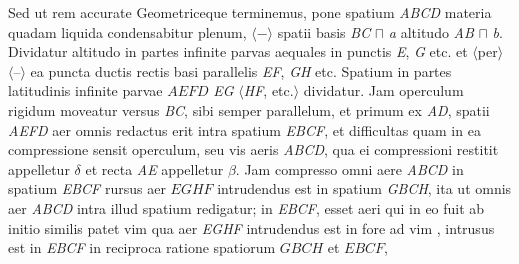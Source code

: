 \pstart {}\rule[-0.3cm]{0cm}{1cm}\pend
\pstart[5 v\textsuperscript{o}] Sed ut rem accurate Geometriceque terminemus, pone spatium \textit{ABCD} 
                     materia quadam liquida condensabitur  plenum, $\langle$−$\rangle$ spatii basis \textit{BC} $\sqcap$ \textit{a} altitudo \textit{AB} $\sqcap$ \textit{b}. Dividatur altitudo in partes infinite parvas aequales                  
 in punctis \textit{E}, \textit{G} etc. et $\langle$per$\rangle$ $\langle$--$\rangle$ ea puncta ductis rectis basi parallelis \textit{EF}, \textit{GH} etc. Spatium in partes latitudinis infinite parvae $AEFD$ \textit{EG} $\langle$\textit{HF}, etc.$\rangle$ dividatur. Jam operculum rigidum  moveatur versus \textit{BC}, sibi semper parallelum, et primum ex \textit{AD}, spatii \textit{AEFD} aer omnis redactus erit intra spatium \textit{EBCF}, et difficultas quam in ea compressione sensit operculum, seu vis aeris \textit{ABCD}, qua ei compressioni restitit appelletur $\delta$ et recta \textit{AE}  appelletur $\beta$. Jam compresso omni aere \textit{ABCD} in spatium \textit{EBCF} rursus aer $EGHF$ intrudendus est in spatium \textit{GBCH}, ita ut omnis aer \textit{ABCD} intra illud spatium redigatur;   in \textit{EBCF}, esset aeri qui in eo fuit ab initio similis patet vim qua aer \textit{EGHF} intrudendus est in  fore ad vim , intrusus est in \textit{EBCF}  in reciproca ratione spatiorum $GBCH$ et $EBCF$,  
